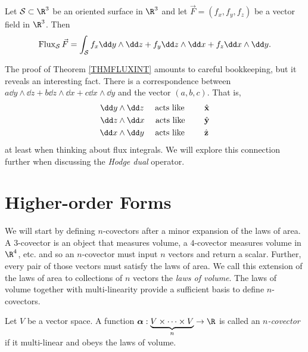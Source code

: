 \begin{theorem}
	\label{THMFLUXINT}
	Let $\mathcal S\subset \R^3$ be an oriented surface in $\R^3$ and
	let $\vec F=(f_x,f_y,f_z)$ be a vector field in $\R^3$.  Then
	\[
		\Flux_{\mathcal S} \vec F
		=\int_{\mathcal S} f_x\dd y\wedge \dd z+f_y \dd z\wedge \dd x
		+f_z \dd x\wedge \dd y.
	\]
\end{theorem}

The proof of Theorem \ref{THMFLUXINT} amounts to careful bookkeeping, but it
reveals an interesting fact.  There is a correspondence between
$a \dd y\wedge \dd z+b\dd z\wedge \dd x+c\dd x\wedge \dd y$
and the vector $(a,b,c)$.  That is,
\begin{alignat*}{2}
	\dd y&\wedge \dd z\quad\text{ acts like } \quad&&\xhat \\
	\dd z&\wedge \dd x\quad\text{ acts like } \quad&&\yhat \\
	\dd x&\wedge \dd y\quad\text{ acts like } \quad&&\zhat 
\end{alignat*}
at least when thinking about flux integrals.  We will explore this
connection further when discussing the \emph{Hodge dual}
operator.

\section{Higher-order Forms}

We will start by defining $n$-covectors after a minor expansion
of the laws of area.  A $3$-covector is an object that measures
volume, a $4$-covector measures volume in $\R^4$, etc. and so
an $n$-covector must input $n$ vectors and return a scalar.  Further,
every pair of those vectors must satisfy the laws of area.  We call this extension
of the laws of area to collections of $n$ vectors the \emph{laws of volume}.  The laws of volume together with multi-linearity provide a sufficient
basis to define $n$-covectors.

\begin{definition}[$n$-covector]
	Let $V$ be a vector space.
	A function $\bm\alpha:\underbrace{V\times \cdots \times V}_{n}
	\to \R$ is called an \emph{$n$-covector} if it multi-linear
	and obeys the laws
	of volume. 
\end{definition}

